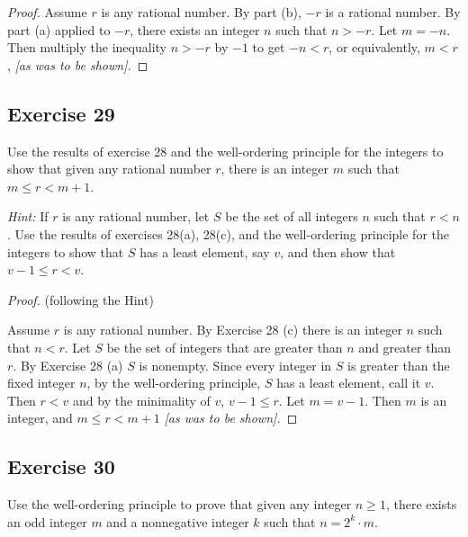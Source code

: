 \documentclass[14pt]{extarticle}
\begin{document}
\begin{proof}
    Assume $r$ is any rational number.
    By part (b), $-r$ is a rational number.
    By part (a) applied to $-r$, there exists an integer $n$ such that $n > -r$. Let $m = -n$.
    Then multiply the inequality $n > -r$ by $-1$ to get $-n < r$, or equivalently, $m < r$, {\it [as was to be shown].}
\end{proof}

\subsection{Exercise 29}
Use the results of exercise 28 and the well-ordering principle for the integers to show that given any rational number $r$, there is an integer $m$ such that $m \leq r < m + 1$.

    {\it Hint:} If $r$ is any rational number, let $S$ be the set of all integers $n$ such that $r < n$.
Use the results of exercises 28(a), 28(c), and the well-ordering principle for the integers to show that $S$ has a
least element, say $v$, and then show that $v - 1 \leq r < v$.

\begin{proof}
    (following the Hint)

    Assume $r$ is any rational number.
    By Exercise 28 (c) there is an integer $n$ such that $n < r$.
    Let $S$ be the set of integers that are greater than $n$ and greater than $r$. By Exercise 28 (a) $S$ is nonempty.
    Since every integer in $S$ is greater than the fixed integer $n$, by the well-ordering principle,
    $S$ has a least element, call it $v$.
    Then $r < v$ and by the minimality of $v$, $v-1 \leq r$.
    Let $m = v-1$. Then $m$ is an integer, and $m \leq r < m+1$ {\it [as was to be shown].}

\end{proof}

\subsection{Exercise 30}
Use the well-ordering principle to prove that given any integer $n \geq 1$, there exists an odd integer $m$ and a nonnegative integer $k$ such that $n = 2^k \cdot m$.
\end{document}
